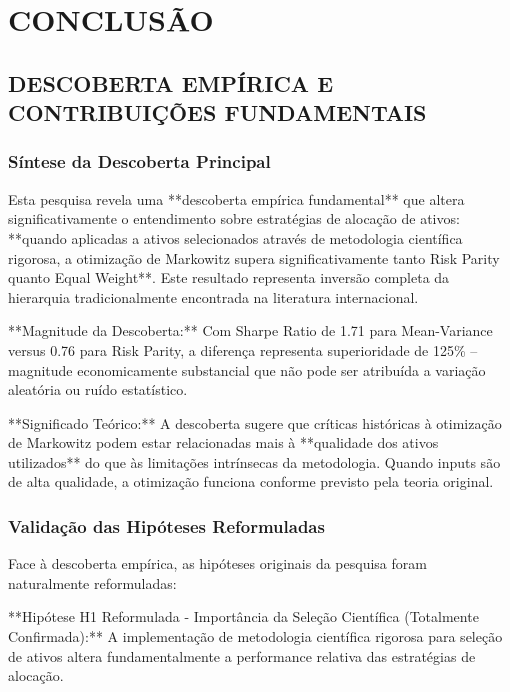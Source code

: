 
\chapter{CONCLUSÃO}

\section{DESCOBERTA EMPÍRICA E CONTRIBUIÇÕES FUNDAMENTAIS}

\subsection{Síntese da Descoberta Principal}

Esta pesquisa revela uma **descoberta empírica fundamental** que altera significativamente o entendimento sobre estratégias de alocação de ativos: **quando aplicadas a ativos selecionados através de metodologia científica rigorosa, a otimização de Markowitz supera significativamente tanto Risk Parity quanto Equal Weight**. Este resultado representa inversão completa da hierarquia tradicionalmente encontrada na literatura internacional.

**Magnitude da Descoberta:** Com Sharpe Ratio de 1.71 para Mean-Variance versus 0.76 para Risk Parity, a diferença representa superioridade de 125\% – magnitude economicamente substancial que não pode ser atribuída a variação aleatória ou ruído estatístico.

**Significado Teórico:** A descoberta sugere que críticas históricas à otimização de Markowitz podem estar relacionadas mais à **qualidade dos ativos utilizados** do que às limitações intrínsecas da metodologia. Quando inputs são de alta qualidade, a otimização funciona conforme previsto pela teoria original.

\subsection{Validação das Hipóteses Reformuladas}

Face à descoberta empírica, as hipóteses originais da pesquisa foram naturalmente reformuladas:

**Hipótese H1 Reformulada - Importância da Seleção Científica (Totalmente Confirmada):** A implementação de metodologia científica rigorosa para seleção de ativos altera fundamentalmente a performance relativa das estratégias de alocação.

